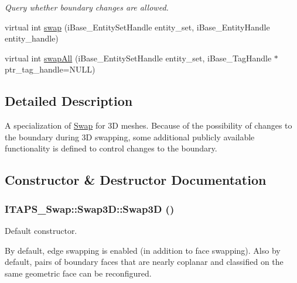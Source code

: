\begin{DoxyCompactItemize}
\begin{DoxyCompactList}\small\item\em Query whether boundary changes are allowed. \item\end{DoxyCompactList}\item 
virtual int \hyperlink{class_i_t_a_p_s___swap_1_1_swap3_d_a82a135da16b4ef6e5ff36f8293cc450c}{swap} (iBase\_\-EntitySetHandle entity\_\-set, iBase\_\-EntityHandle entity\_\-handle)
\item 
virtual int \hyperlink{class_i_t_a_p_s___swap_1_1_swap3_d_a139a400102ad7039fcc74d92d72dea27}{swapAll} (iBase\_\-EntitySetHandle entity\_\-set, iBase\_\-TagHandle $\ast$ptr\_\-tag\_\-handle=NULL)
\end{DoxyCompactItemize}


\subsection{Detailed Description}
A specialization of \hyperlink{class_i_t_a_p_s___swap_1_1_swap}{Swap} for 3D meshes. Because of the possibility of changes to the boundary during 3D swapping, some additional publicly available functionality is defined to control changes to the boundary. 

\subsection{Constructor \& Destructor Documentation}
\hypertarget{class_i_t_a_p_s___swap_1_1_swap3_d_acf6445ad45f957369eb20b0671bfd5ba}{
\subsubsection[{Swap3D}]{\setlength{\rightskip}{0pt plus 5cm}ITAPS\_\-Swap::Swap3D::Swap3D ()}}
\label{class_i_t_a_p_s___swap_1_1_swap3_d_acf6445ad45f957369eb20b0671bfd5ba}


Default constructor. 

By default, edge swapping is enabled (in addition to face swapping). Also by default, pairs of boundary faces that are nearly coplanar and classified on the same geometric face can be reconfigured. 

